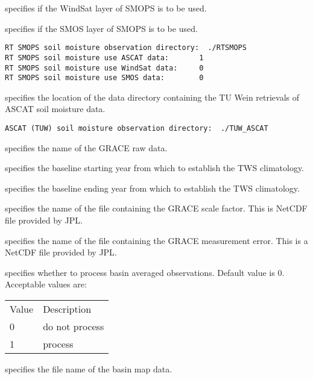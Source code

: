  specifies if the WindSat layer of SMOPS is to be used.

 specifies if the SMOS layer of SMOPS is to be used.

 

 \begin{Verbatim}[frame=single]
RT SMOPS soil moisture observation directory:  ./RTSMOPS
RT SMOPS soil moisture use ASCAT data:       1
RT SMOPS soil moisture use WindSat data:     0
RT SMOPS soil moisture use SMOS data:        0
 \end{Verbatim}

 
 specifies the location of the data directory containing the TU Wein
 retrievals of ASCAT soil moisture data.
 

 \begin{Verbatim}[frame=single]
ASCAT (TUW) soil moisture observation directory:  ./TUW_ASCAT
 \end{Verbatim}


 
 specifies the name of the GRACE raw data.

 specifies the baseline starting year from which to establish the TWS
 climatology.

 specifies the baseline ending year from which to establish the TWS
 climatology.

  specifies the name of the file
 containing the GRACE scale factor.  This is NetCDF file provided
 by JPL.

  specifies the name of the file
 containing the GRACE measurement error.  This is a NetCDF file provided
 by JPL.

  specifies whether to
 process basin averaged observations.  Default value is 0.
 Acceptable values are:

 \begin{tabular}{ll}
 Value & Description    \\
 0     & do not process \\
 1     & process        \\
 \end{tabular}

  specifies the file name of the
 basin map data.

